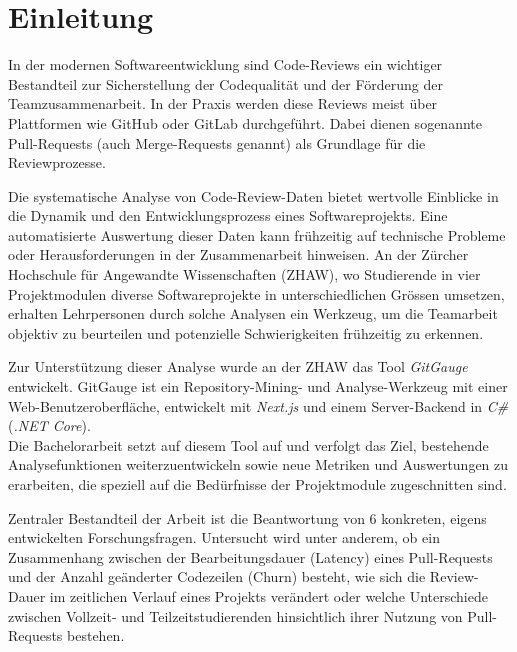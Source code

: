


\chapter{Einleitung} %
In der modernen Softwareentwicklung sind Code-Reviews ein wichtiger Bestandteil zur Sicherstellung der Codequalität und der Förderung der Teamzusammenarbeit. In der Praxis werden diese Reviews meist über Plattformen wie GitHub oder GitLab durchgeführt. Dabei dienen sogenannte Pull-Requests (auch Merge-Requests genannt) als Grundlage für die Reviewprozesse.

Die systematische Analyse von Code-Review-Daten bietet wertvolle Einblicke in die Dynamik und den Entwicklungsprozess eines Softwareprojekts. Eine automatisierte Auswertung dieser Daten kann frühzeitig auf technische Probleme oder Herausforderungen in der Zusammenarbeit hinweisen. An der Zürcher Hochschule für Angewandte Wissenschaften (ZHAW), wo Studierende in vier Projektmodulen diverse Softwareprojekte in unterschiedlichen Grössen umsetzen, erhalten Lehrpersonen durch solche Analysen ein Werkzeug, um die Teamarbeit objektiv zu beurteilen und potenzielle Schwierigkeiten frühzeitig zu erkennen.

Zur Unterstützung dieser Analyse wurde an der ZHAW das Tool \textit{GitGauge} entwickelt. GitGauge ist ein Repository-Mining- und Analyse-Werkzeug mit einer Web-Benutzeroberfläche, entwickelt mit \textit{Next.js} und einem Server-Backend in \textit{C\#} (\textit{.NET Core}).  \\
Die Bachelorarbeit setzt auf diesem Tool auf und verfolgt das Ziel, bestehende Analysefunktionen weiterzuentwickeln sowie neue Metriken und Auswertungen zu erarbeiten, die speziell auf die Bedürfnisse der Projektmodule zugeschnitten sind.

Zentraler Bestandteil der Arbeit ist die Beantwortung von 6 konkreten, eigens entwickelten Forschungsfragen. Untersucht wird unter anderem, ob ein Zusammenhang zwischen der Bearbeitungsdauer (Latency) eines Pull-Requests und der Anzahl geänderter Codezeilen (Churn) besteht, wie sich die Review-Dauer im zeitlichen Verlauf eines Projekts verändert oder welche Unterschiede zwischen Vollzeit- und Teilzeitstudierenden hinsichtlich ihrer Nutzung von Pull-Requests bestehen.

